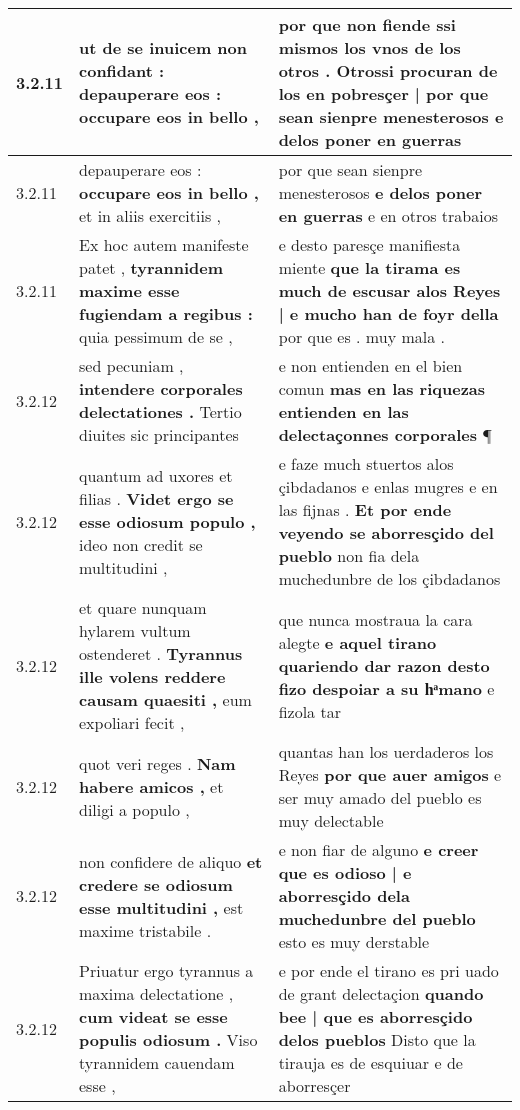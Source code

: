 \begin{tabular}{|p{1cm}|p{6.5cm}|p{6.5cm}|}
3.2.11 & ut de se inuicem non confidant : \textbf{ depauperare eos : } occupare eos in bello , & por que non fiende ssi mismos los vnos de los otros . \textbf{ Otrossi procuran de los en pobresçer | por que sean sienpre menesterosos } e delos poner en guerras \\\hline
3.2.11 & depauperare eos : \textbf{ occupare eos in bello , } et in aliis exercitiis , & por que sean sienpre menesterosos \textbf{ e delos poner en guerras } e en otros trabaios \\\hline
3.2.11 & Ex hoc autem manifeste patet , \textbf{ tyrannidem maxime esse fugiendam a regibus : } quia pessimum de se , & e desto paresçe manifiesta miente \textbf{ que la tirama es much de escusar alos Reyes | e mucho han de foyr della } por que es . muy mala . \\\hline
3.2.12 & sed pecuniam , \textbf{ intendere corporales delectationes . } Tertio diuites sic principantes & e non entienden en el bien comun \textbf{ mas en las riquezas entienden en las delectaçonnes corporales } ¶ \\\hline
3.2.12 & quantum ad uxores et filias . \textbf{ Videt ergo se esse odiosum populo , } ideo non credit se multitudini , & e faze much stuertos alos çibdadanos e enlas mugres e en las fijnas . \textbf{ Et por ende veyendo se aborresçido del pueblo } non fia dela muchedunbre de los çibdadanos \\\hline
3.2.12 & et quare nunquam hylarem vultum ostenderet . \textbf{ Tyrannus ille volens reddere causam quaesiti , } eum expoliari fecit , & que nunca mostraua la cara alegte \textbf{ e aquel tirano quariendo dar razon desto fizo despoiar a su hͣmano } e fizola tar \\\hline
3.2.12 & quot veri reges . \textbf{ Nam habere amicos , } et diligi a populo , & quantas han los uerdaderos los Reyes \textbf{ por que auer amigos } e ser muy amado del pueblo es muy delectable \\\hline
3.2.12 & non confidere de aliquo \textbf{ et credere se odiosum esse multitudini , } est maxime tristabile . & e non fiar de alguno \textbf{ e creer que es odioso | e aborresçido dela muchedunbre del pueblo } esto es muy derstable \\\hline
3.2.12 & Priuatur ergo tyrannus a maxima delectatione , \textbf{ cum videat se esse populis odiosum . } Viso tyrannidem cauendam esse , & e por ende el tirano es pri uado de grant delectaçion \textbf{ quando bee | que es aborresçido delos pueblos } Disto que la tirauja es de esquiuar e de aborresçer \\\hline

\end{tabular}

